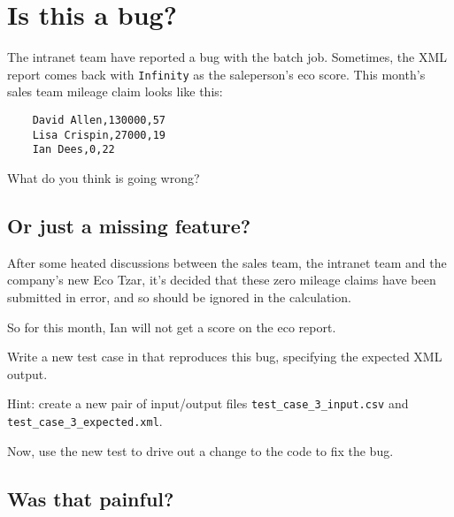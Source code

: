 \chapter*{Is this a bug?}

The intranet team have reported a bug with the batch job. Sometimes, the XML report comes back with \texttt{Infinity} as the saleperson's eco score. This month's sales team mileage claim looks like this:

\begin{verbatim}
    David Allen,130000,57
    Lisa Crispin,27000,19
    Ian Dees,0,22
    \end{verbatim}

What do you think is going wrong?


\section*{Or just a missing feature?}

After some heated discussions between the sales team, the intranet team and the company's new Eco Tzar, it's decided that these zero mileage claims have been submitted in error, and so should be ignored in the calculation.

So for this month, Ian will not get a score on the eco report.

Write a new test case in \texttt{} that reproduces this bug, specifying the expected XML output.

\begin{sloppypar}
Hint: create a new pair of input/output files \texttt{test_case_3_input.csv} and \texttt{test_case_3_expected.xml}.
\end{sloppypar}

Now, use the new test to drive out a change to the code to fix the bug.

\section*{Was that painful?}




